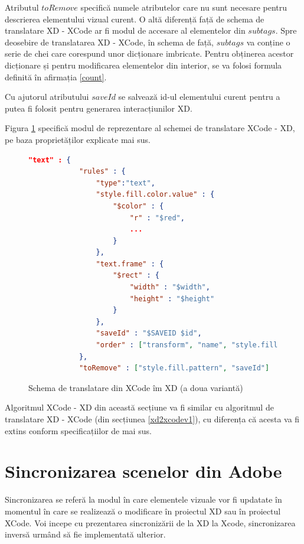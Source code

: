 Atributul $toRemove$ specifică numele atributelor care nu sunt necesare pentru descrierea elementului vizual curent.
O altă diferență față de schema de translatare XD - XCode ar fi modul de accesare al elementelor din $subtags$.
Spre deosebire de translatarea XD - XCode, în schema de față, $subtags$ va conține o serie de chei care corespund unor dicționare imbricate. Pentru obținerea acestor dicționare și pentru modificarea elementelor din interior, se va folosi formula definită în afirmația \ref{count}.

Cu ajutorul atributului $saveId$ se salvează id-ul elementului curent pentru a putea fi folosit pentru generarea interacțiunilor XD.

Figura \ref{fig:Schema2} specifică modul de reprezentare al schemei de translatare XCode - XD, pe baza proprietăților explicate mai sus.

\begin{figure}[!htbp]
\begin{lstlisting}[language=json,firstnumber=1]
 "text" : {
            "rules" : {
                "type":"text",
                "style.fill.color.value" : {
                    "$color" : {
                        "r" : "$red",
                        ...
                    }
                },
                "text.frame" : {
                    "$rect" : {
                        "width" : "$width",
                        "height" : "$height"
                    }
                },
                "saveId" : "$SAVEID $id",
                "order" : ["transform", "name", "style.fill.color.value", "style.font", "text.frame", "text.rawText", "meta.ux.rangedStyles", "text.paragraphs", "saveId"]
            },
            "toRemove" : ["style.fill.pattern", "saveId"] 
\end{lstlisting}
\caption{Schema de translatare din XCode îm XD (a doua variantă)} \label{fig:Schema2}
\end{figure}

Algoritmul XCode - XD din această secțiune va fi similar cu algoritmul de translatare XD - XCode (din secțiunea \ref{xd2xcodev1}), cu diferența că acesta va fi extins conform specificațiilor de mai sus.

\section{Sincronizarea scenelor din Adobe } \label{syncme}

Sincronizarea se referă la modul în care elementele vizuale vor fi updatate în momentul în care se realizează o modificare în proiectul XD sau în proiectul XCode.
Voi incepe cu prezentarea sincronizării de la XD la Xcode, sincronizarea inversă urmând să fie implementată ulterior.

